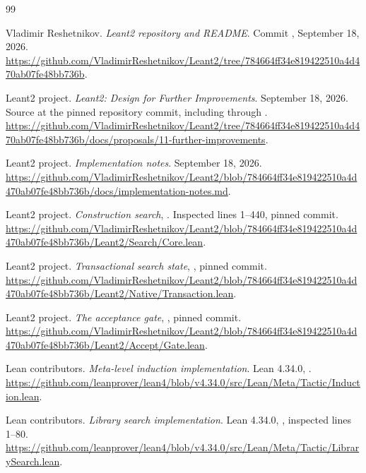 \clearpage
{}
{}
\begin{thebibliography}{99}
\small
\raggedright
\setlength{\itemsep}{5pt}

 Vladimir Reshetnikov. \emph{Leant2 repository and README}.
Commit , September 18, 2026.
\url{https://github.com/VladimirReshetnikov/Leant2/tree/784664ff34e819422510a4d470ab07fe48bb736b}.

 Leant2 project. \emph{Leant2: Design for Further Improvements}.
September 18, 2026. Source at the pinned repository commit, including
 through .
\url{https://github.com/VladimirReshetnikov/Leant2/tree/784664ff34e819422510a4d470ab07fe48bb736b/docs/proposals/11-further-improvements}.

 Leant2 project. \emph{Implementation notes}.
September 18, 2026.
\url{https://github.com/VladimirReshetnikov/Leant2/blob/784664ff34e819422510a4d470ab07fe48bb736b/docs/implementation-notes.md}.

 Leant2 project. \emph{Construction search},
. Inspected lines 1--440, pinned commit.
\url{https://github.com/VladimirReshetnikov/Leant2/blob/784664ff34e819422510a4d470ab07fe48bb736b/Leant2/Search/Core.lean}.

 Leant2 project. \emph{Transactional search state},
, pinned commit.
\url{https://github.com/VladimirReshetnikov/Leant2/blob/784664ff34e819422510a4d470ab07fe48bb736b/Leant2/Native/Transaction.lean}.

 Leant2 project. \emph{The acceptance gate},
, pinned commit.
\url{https://github.com/VladimirReshetnikov/Leant2/blob/784664ff34e819422510a4d470ab07fe48bb736b/Leant2/Accept/Gate.lean}.

 Lean contributors. \emph{Meta-level induction implementation}.
Lean 4.34.0, .
\url{https://github.com/leanprover/lean4/blob/v4.34.0/src/Lean/Meta/Tactic/Induction.lean}.

 Lean contributors. \emph{Library search implementation}.
Lean 4.34.0, , inspected lines 1--80.
\url{https://github.com/leanprover/lean4/blob/v4.34.0/src/Lean/Meta/Tactic/LibrarySearch.lean}.


\end{thebibliography}
